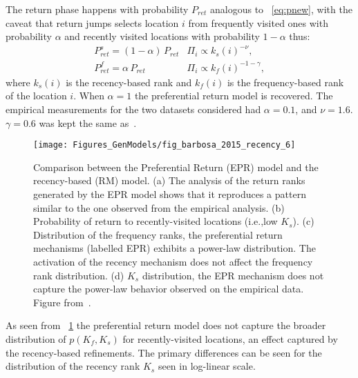   
The return phase happens with probability $P_{ret}$ analogous to \equationname~\eqref{eq:pnew}, with the caveat that return jumps selects location $i$ from  frequently visited ones with probability $\alpha$ and recently visited locations with probability $1 - \alpha$ thus:
\begin{equation} \label{eq:recency}
\begin{array}{ll}
P^s_{ret} = (1 - \alpha) \, P_{ret} & \Pi_i \propto k_s(i)^{-\nu} ,\\
P^f_{ret} = \alpha \, P_{ret} & \Pi_i \propto k_f(i)^{-1-\gamma} ,
\end{array}
\end{equation}
where $k_s(i)$ is the recency-based rank and $k_f(i)$ is the frequency-based rank of the location $i$. When $\alpha = 1$ the preferential return model is recovered. The empirical measurements for the two datasets considered had $\alpha = 0.1$, and $\nu = 1.6$. $\gamma = 0.6$ was kept the same as~\cite{song_2010_modelling}.

\begin{figure}[t!]
\centering
\texttt{[image: Figures\_GenModels/fig\_barbosa\_2015\_recency\_6]}
\caption{Comparison between the Preferential Return (EPR) model and the recency-based (RM) model. (a) The analysis of the return ranks generated by the EPR model shows that it reproduces a pattern similar to the one observed from the empirical analysis.
(b) Probability of return to recently-visited locations (i.e.,low $K_s$). (c) Distribution of the frequency ranks, the preferential return mechanisms (labelled EPR) exhibits a power-law distribution. The activation of the recency mechanism does not affect the frequency rank distribution. (d) $K_s$ distribution, the EPR mechanism does not capture the power-law behavior observed on the empirical data. Figure from~\cite{barbosa_2015_effect}.}
\label{fig:barbosa_2015_6}
\end{figure}

As seen from \figurename~\ref{fig:barbosa_2015_6} the preferential return model does not capture the broader distribution of $p(K_{f},K_{s})$ for recently-visited locations, an effect captured by the recency-based refinements. The primary differences can be seen for the distribution of the recency rank $K_s$ seen in log-linear scale.

